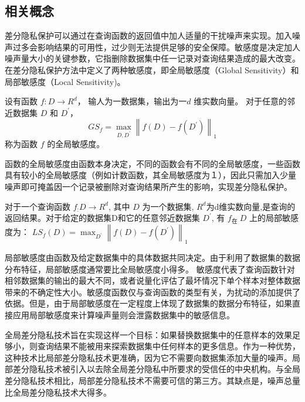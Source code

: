\subsection{相关概念}
差分隐私保护可以通过在查询函数的返回值中加人适量的干扰噪声来实现。加入噪声过多会影响结果的可用性，过少则无法提供足够的安全保障。敏感度是决定加人噪声量大小的关键参数，它指删除数据集中任一记录对查询结果造成的最大改变。 在差分隐私保护方法中定义了两种敏感度，即全局敏感度（Global Sensitivity）和局部敏感度（Local Sensitivity)。

\begin{define}[全局敏感度]\label{全局敏感度}
设有函数 $f: D \rightarrow R^{d}$， 输人为一数据集，输出为一$d$ 维实数向量。 对于任意的邻近数据集 $D$ 和 $D^{\prime}$，
$$
G S_{f}=\max _{D, D^{\prime}}\left\|f(D)-f\left(D^{\prime}\right)\right\|_{1}
$$
称为函数 $f$ 的全局敏感度。
\end{define}

函数的全局敏感度由函数本身决定，不同的函数会有不同的全局敏感度，一些函数具有较小的全局敏感度（例如计数函数，其全局敏感度为１），因此只需加入少量噪声即可掩盖因一个记录被删除对查询结果所产生的影响，实现差分隐私保护。

\begin{define}[局部敏感度]\label{局部敏感度}
对于一个查询函数 $f_{:} D \rightarrow R^{d}$, 其中 $D$ 为一个数据集, $R^{d}$为d维实数向量,是查询的返回结果。对于给定的数据集D和它的任意邻近数据集 $D^{\prime}$, 有 $f_{\text {在 }} D$ 上的局部敏感度为：
$L S_{f}(D)=\max _{D^{\prime}}\left\|f(D)-f\left(D^{\prime}\right)\right\|_{1}$
\end{define}

局部敏感度由函数及给定数据集中的具体数据共同决定。由于利用了数据集的数据分布特征，局部敏感度通常要比全局敏感度小得多。
敏感度代表了查询函数针对相邻数据集的输出的最大不同，或者说量化评估了最坏情况下单个样本对整体数据带来的不确定性大小。敏感度函数仅与查询函数的类型有关，为扰动的添加提供了依据。但是，由于局部敏感度在一定程度上体现了数据集的数据分布特征，如果直接应用局部敏感度来计算噪声量则会泄露数据集中的敏感信息。

全局差分隐私技术旨在实现这样一个目标：如果替换数据集中的任意样本的效果足够小，则查询结果不能被用来探索数据集中任何样本的更多信息。作为一种优势，这种技术比局部差分隐私技术更准确，因为它不需要向数据集添加大量的噪声。局部差分隐私技术被引入以去除全局差分隐私中所要求的受信任的中央机构。与全局差分隐私技术相比，局部差分隐私技术不需要可信的第三方。其缺点是，噪声总量比全局差分隐私技术大得多。

